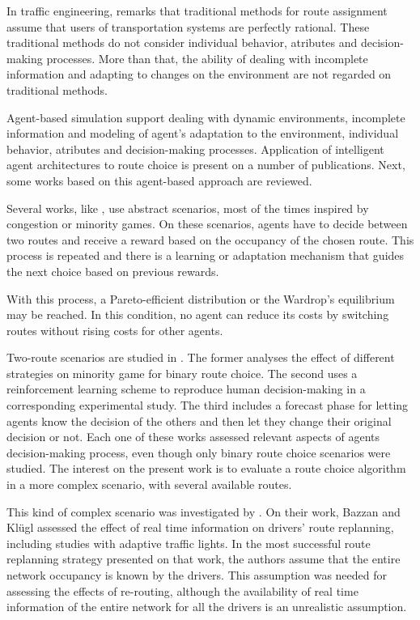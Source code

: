 \documentclass[12pt]{article}
\begin{document}
In traffic engineering, \cite{Bazzan&Kluegl2007} remarks that traditional methods for route assignment assume that users of transportation systems are perfectly rational. These traditional methods do not consider individual behavior, atributes and decision-making processes. More than that, the ability of dealing with incomplete information and adapting to changes on the environment are not regarded on traditional methods.

Agent-based simulation support dealing with dynamic environments, incomplete information and modeling of agent's adaptation to the environment, individual behavior, atributes and decision-making processes. Application of intelligent agent architectures to route choice is present on a number of publications. Next, some works based on this agent-based approach are reviewed.

Several works, like \cite{Bazzan+2000icmas, Chmura&Pitz2007, Kluegl&Bazzan2004}, use abstract scenarios, most of the times inspired by congestion or minority games. On these scenarios, agents have to decide between two routes and receive a reward based on the occupancy of the chosen route. This process is repeated and there is a learning or adaptation mechanism that guides the next choice based on previous rewards.

With this process, a Pareto-efficient distribution or the Wardrop's equilibrium \cite{Wardrop1952} may be reached. In this condition, no agent can reduce its costs by switching routes without rising costs for other agents. 

Two-route scenarios are studied in \cite{Bazzan+2000icmas, Chmura&Pitz2007, Kluegl&Bazzan2004}. The former analyses the effect of different strategies on minority game for binary route choice. The second uses a reinforcement learning scheme to reproduce human decision-making in a corresponding experimental study. The third includes a forecast phase for letting agents know the decision of the others and then let they change their original decision or not. Each one of these works assessed relevant aspects of agents decision-making process, even though only binary route choice scenarios were studied. The interest on the present work is to evaluate a route choice algorithm in a more complex scenario, with several available routes.

This kind of complex scenario was investigated by \cite{Bazzan&Kluegl2008}. On their work, Bazzan and Kl\"ugl assessed the effect of real time information on drivers' route replanning, including studies with adaptive traffic lights. In the most successful route replanning strategy presented on that work, the authors assume that the entire network occupancy is known by the drivers. This assumption was needed for assessing the effects of re-routing, although the availability of real time information of the entire network for all the drivers is an unrealistic assumption.
\end{document}
